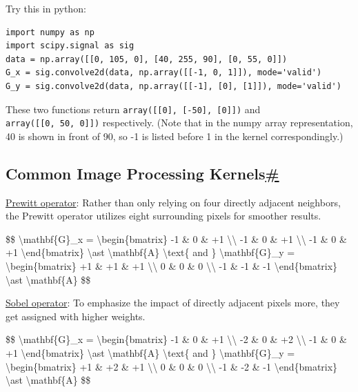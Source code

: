 Try this in python:

\begin{verbatim}
import numpy as np
import scipy.signal as sig
data = np.array([[0, 105, 0], [40, 255, 90], [0, 55, 0]])
G_x = sig.convolve2d(data, np.array([[-1, 0, 1]]), mode='valid') 
G_y = sig.convolve2d(data, np.array([[-1], [0], [1]]), mode='valid')
\end{verbatim}

These two functions return \texttt{array({[}{[}0{]},\ {[}-50{]},\ {[}0{]}{]})} and \texttt{array({[}{[}0,\ 50,\ 0{]}{]})} respectively. (Note that in the numpy array representation, 40 is shown in front of 90, so -1 is listed before 1 in the kernel correspondingly.)

\subsection{\texorpdfstring{Common Image Processing Kernels\hyperref[common-image-processing-kernels]{\#}}{Common Image Processing Kernels\#}}\label{common-image-processing-kernels}

\href{https://en.wikipedia.org/wiki/Prewitt_operator}{Prewitt operator}: Rather than only relying on four directly adjacent neighbors, the Prewitt operator utilizes eight surrounding pixels for smoother results.

\$\$ \textbackslash mathbf\{G\}\_x = \textbackslash begin\{bmatrix\} -1 \& 0 \& +1 \textbackslash\textbackslash{} -1 \& 0 \& +1 \textbackslash\textbackslash{} -1 \& 0 \& +1 \textbackslash end\{bmatrix\} \textbackslash ast \textbackslash mathbf\{A\} \textbackslash text\{ and \} \textbackslash mathbf\{G\}\_y = \textbackslash begin\{bmatrix\} +1 \& +1 \& +1 \textbackslash\textbackslash{} 0 \& 0 \& 0 \textbackslash\textbackslash{} -1 \& -1 \& -1 \textbackslash end\{bmatrix\} \textbackslash ast \textbackslash mathbf\{A\} \$\$

\href{https://en.wikipedia.org/wiki/Sobel_operator}{Sobel operator}: To emphasize the impact of directly adjacent pixels more, they get assigned with higher weights.

\$\$ \textbackslash mathbf\{G\}\_x = \textbackslash begin\{bmatrix\} -1 \& 0 \& +1 \textbackslash\textbackslash{} -2 \& 0 \& +2 \textbackslash\textbackslash{} -1 \& 0 \& +1 \textbackslash end\{bmatrix\} \textbackslash ast \textbackslash mathbf\{A\} \textbackslash text\{ and \} \textbackslash mathbf\{G\}\_y = \textbackslash begin\{bmatrix\} +1 \& +2 \& +1 \textbackslash\textbackslash{} 0 \& 0 \& 0 \textbackslash\textbackslash{} -1 \& -2 \& -1 \textbackslash end\{bmatrix\} \textbackslash ast \textbackslash mathbf\{A\} \$\$

